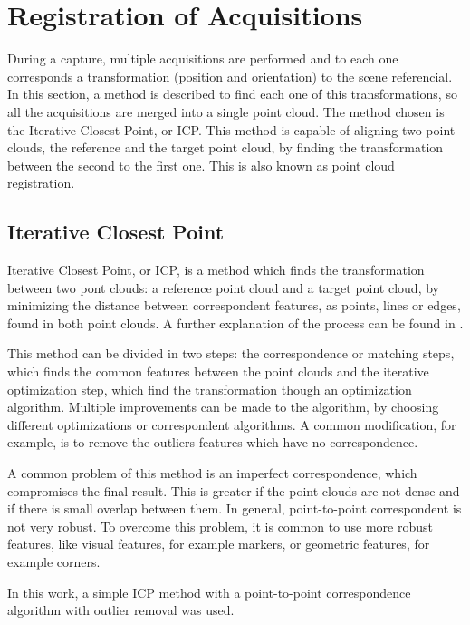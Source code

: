 \section{Registration of Acquisitions}
\label{section:acquisition-registration}

During a capture, multiple acquisitions are performed and to each one corresponds a transformation (position and orientation) to the scene referencial. In this section, a method is described to find each one of this transformations, so all the acquisitions are merged into a single point cloud. The method chosen is the Iterative Closest Point, or ICP. This method is capable of aligning two point clouds, the reference and the target point cloud, by finding the transformation between the second to the first one. This is also known as point cloud registration.

\subsection{Iterative Closest Point}

\newcommand{\T}{\mathrm{T}}
\newcommand{\Pt}{\mathcal{P}}
\newcommand{\Q}{\mathcal{Q}}

Iterative Closest Point, or ICP, is a method which finds the transformation between two pont clouds: a reference point cloud and a target point cloud, by minimizing the distance between correspondent features, as points, lines or edges, found in both point clouds. A further explanation of the process can be found in \cite{besl92}.

This method can be divided in two steps: the correspondence or matching steps, which finds the common features between the point clouds and the iterative optimization step, which find the transformation though an optimization algorithm. Multiple improvements can be made to the algorithm, by choosing different optimizations or correspondent algorithms. A common modification, for example, is to remove the outliers features which have no correspondence.

A common problem of this method is an imperfect correspondence, which compromises the final result. This is greater if the point clouds are not dense and if there is small overlap between them. In general, point-to-point correspondent is not very robust. To overcome this problem, it is common to use more robust features, like visual features, for example markers, or geometric features, for example corners.

In this work, a simple ICP method with a point-to-point correspondence algorithm with outlier removal was used.

